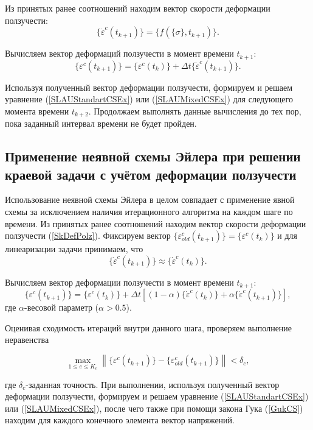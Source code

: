 \documentclass[a4paper,14pt]{extarticle}
\begin{document}
Из принятых ранее соотношений находим вектор скорости деформации ползучести:
\begin{equation}\label{SkDefPolz}
\{\dot{\varepsilon}^{c}(t_{k+1})\}=\{f(\{\sigma\},t_{k+1})\}.
\end{equation}

Вычисляем вектор деформаций ползучести в момент времени $t_{k+1}$:
\begin{equation}
\{\varepsilon^{c}(t_{k+1})\}=\{\varepsilon^{c}(t_{k})\}+\Delta t \{\dot{\varepsilon}^{c}(t_{k+1})\}.
\end{equation}

Используя полученный вектор деформации ползучести, формируем и решаем уравнение (\ref{SLAUStandartCSEx}) или (\ref{SLAUMixedCSEx}) для следующего момента времени $t_{k+2}$. Продолжаем выполнять данные вычисления до тех пор, пока заданный интервал времени не будет пройден.

\newpage

\subsection{Применение неявной схемы Эйлера при решении краевой задачи с учётом деформации ползучести}
\normalsize
Использование неявной схемы Эйлера в целом совпадает с применение явной схемы за исключением наличия итерационного алгоритма на каждом шаге по времени. Из принятых ранее соотношений находим вектор скорости деформации ползучести (\ref{SkDefPolz}). Фиксируем вектор $\{\varepsilon^{c}_{old}(t_{k+1})\}=\{\varepsilon^{c}(t_{k})\}$ и для линеаризации задачи принимаем, что
\[
\{\dot{\varepsilon}^{c}(t_{k+1})\}\approx\{\dot{\varepsilon}^{c}(t_k)\}. 
\]

Вычисляем вектор деформации ползучести в момент времени $t_{k+1}$:
\begin{equation}
\{\varepsilon^{c}(t_{k+1})\}=\{\varepsilon^{c}(t_{k})\}+\Delta t \left[(1-\alpha)\{\dot{\varepsilon}^{c}(t_{k})\}+\alpha\{\dot{\varepsilon}^{c}(t_{k+1})\}\right],
\end{equation}
где $\alpha$-весовой параметр ($\alpha>0.5$).

Оценивая сходимость итераций внутри данного шага, проверяем выполнение неравенства

\begin{equation*}\label{UslShod}
\max_{ 1\leq e \leq K_e} \left\|\{\varepsilon^c (t_{k+1})\}-\{\varepsilon^c_{old} (t_{k+1})\}\right\|<\delta_c,
\end{equation*}

где $\delta_c$-заданная точность. При выполнении, используя полученный вектор деформации ползучести, формируем и решаем уравнение (\ref{SLAUStandartCSEx}) или (\ref{SLAUMixedCSEx}), после чего также при помощи закона Гука (\ref{GukCS}) находим для каждого конечного элемента вектор напряжений. 
\end{document}
